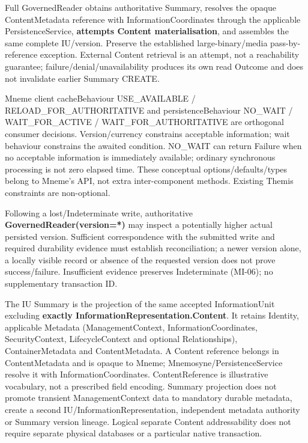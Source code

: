 Full GovernedReader obtains authoritative Summary, resolves the opaque ContentMetadata reference with InformationCoordinates through the applicable PersistenceService, \textbf{attempts Content materialisation}, and assembles the same complete IU/version. Preserve the established large-binary/media pass-by-reference exception. External Content retrieval is an attempt, not a reachability guarantee; failure/denial/unavailability produces its own read Outcome and does not invalidate earlier Summary CREATE.



Mneme client cacheBehaviour USE\_AVAILABLE / RELOAD\_FOR\_AUTHORITATIVE and persistenceBehaviour NO\_WAIT / WAIT\_FOR\_ACTIVE / WAIT\_FOR\_AUTHORITATIVE are orthogonal consumer decisions. Version/currency constrains acceptable information; wait behaviour constrains the awaited condition. NO\_WAIT can return Failure when no acceptable information is immediately available; ordinary synchronous processing is not zero elapsed time. These conceptual options/defaults/types belong to Mneme's API, not extra inter-component methods. Existing Themis constraints are non-optional.



Following a lost/Indeterminate write, authoritative \textbf{GovernedReader(version=*)} may inspect a potentially higher actual persisted version. Sufficient correspondence with the submitted write and required durability evidence must establish reconciliation; a newer version alone, a locally visible record or absence of the requested version does not prove success/failure. Insufficient evidence preserves Indeterminate (MI-06); no supplementary transaction ID.



The IU Summary is the projection of the same accepted InformationUnit excluding \textbf{exactly InformationRepresentation.Content}. It retains Identity, applicable Metadata (ManagementContext, InformationCoordinates, SecurityContext, LifecycleContext and optional Relationships), ContainerMetadata and ContentMetadata. A Content reference belongs in ContentMetadata and is opaque to Mneme; Mnemosyne/PersistenceService resolve it with InformationCoordinates. ContentReference is illustrative vocabulary, not a prescribed field encoding. Summary projection does not promote transient ManagementContext data to mandatory durable metadata, create a second IU/InformationRepresentation, independent metadata authority or Summary version lineage. Logical separate Content addressability does not require separate physical databases or a particular native transaction.



